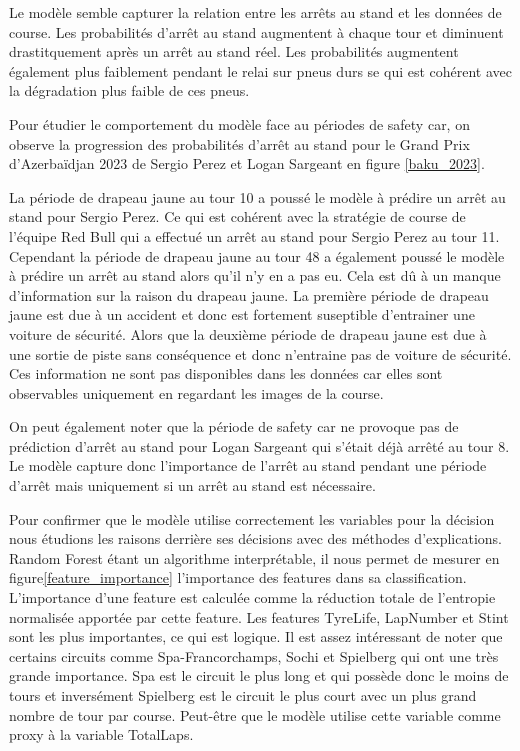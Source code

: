 Le modèle semble capturer la relation entre les arrêts au stand et les données de course.
Les probabilités d'arrêt au stand augmentent à chaque tour et diminuent drastitquement après un arrêt au stand réel.
Les probabilités augmentent également plus faiblement pendant le relai sur pneus durs se qui est cohérent avec la dégradation plus faible de ces pneus.

Pour étudier le comportement du modèle face au périodes de safety car, on observe la progression des probabilités d'arrêt au stand pour le Grand Prix d'Azerbaïdjan 2023 de Sergio Perez et Logan Sargeant en figure \ref{baku_2023}.


La période de drapeau jaune au tour 10 a poussé le modèle à prédire un arrêt au stand pour Sergio Perez.
Ce qui est cohérent avec la stratégie de course de l'équipe Red Bull qui a effectué un arrêt au stand pour Sergio Perez au tour 11.
Cependant la période de drapeau jaune au tour 48 a également poussé le modèle à prédire un arrêt au stand alors qu'il n'y en a pas eu.
Cela est dû à un manque d'information sur la raison du drapeau jaune. La première période de drapeau jaune est due à un accident et donc est fortement suseptible d'entrainer une voiture de sécurité.
Alors que la deuxième période de drapeau jaune est due à une sortie de piste sans conséquence et donc n'entraine pas de voiture de sécurité.
Ces information ne sont pas disponibles dans les données car elles sont observables uniquement en regardant les images de la course.

On peut également noter que la période de safety car ne provoque pas de prédiction d'arrêt au stand pour Logan Sargeant qui s'était déjà arrêté au tour 8.
Le modèle capture donc l'importance de l'arrêt au stand pendant une période d'arrêt mais uniquement si un arrêt au stand est nécessaire.

Pour confirmer que le modèle utilise correctement les variables pour la décision nous étudions les raisons derrière ses décisions avec des méthodes d'explications.
Random Forest étant un algorithme interprétable, il nous permet de mesurer en figure\ref{feature_importance} l'importance des features dans sa classification.
L'importance d'une feature est calculée comme la réduction totale de l'entropie normalisée apportée par cette feature.
Les features TyreLife, LapNumber et Stint sont les plus importantes, ce qui est logique.
Il est assez intéressant de noter que certains circuits comme Spa-Francorchamps, Sochi et Spielberg qui ont une très grande importance.
Spa est le circuit le plus long et qui possède donc le moins de tours et inversément Spielberg est le circuit le plus court avec un plus grand nombre de tour par course.
Peut-être que le modèle utilise cette variable comme proxy à la variable TotalLaps.

